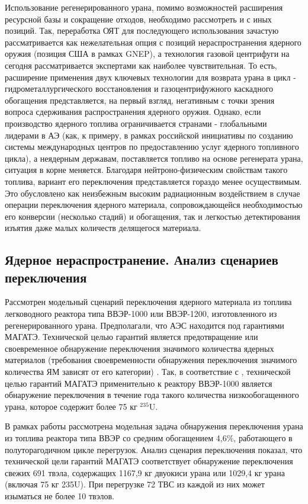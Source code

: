 Использование регенерированного урана, помимо возможностей расширения ресурсной базы и сокращение отходов, необходимо рассмотреть и с иных позиций. Так, переработка ОЯТ для последующего использования зачастую рассматривается как нежелательная опция с позиций нераспространения ядерного оружия (позиция США в рамках GNEP), а технология газовой центрифуги на сегодня рассматривается экспертами как наиболее чувствительная. То есть, расширение применения двух ключевых технологии для возврата урана в цикл - гидрометаллургического восстановления и газоцентрифужного каскадного обогащения представляется, на первый взгляд, негативным с точки зрения вопроса сдерживания распространения ядерного оружия. Однако, если производство ядерного топлива ограничивается странами - глобальными лидерами в АЭ (как, к примеру, в рамках российской инициативы по созданию системы международных центров по предоставлению услуг ядерного топливного цикла), а неядерным державам, поставляется топливо на основе регенерата урана, ситуация в корне меняется. Благодаря нейтроно-физическим свойствам такого топлива, вариант его переключения представляется гораздо менее осуществимым. Это обусловлено как неизбежным высоким радиационным воздействием в случае операции переключения ядерного материала, сопровождающейся необходимостью его конверсии (несколько стадий) и обогащения, так и легкостью детектирования изъятия даже малых количеств делящегося материала.


\subsection{Ядерное нераспространение. Анализ сценариев переключения}\label{sec:ch1/sec1.1}

Рассмотрен модельный сценарий переключения ядерного материала из топлива легководного реактора типа ВВЭР-1000 или ВВЭР-1200,  изготовленного из регенерированного урана. Предполагали, что АЭС находится под гарантиями МАГАТЭ. Технической целью гарантий является предотвращение или своевременное обнаружение переключения значимого количества ядерных материалов (требования своевременности обнаружения переключения значимого количества ЯМ зависят от  его категории) \cite{bumblis}. Так, в соответствие с \cite{bumblis}, технической целью гарантий МАГАТЭ применительно к реактору ВВЭР-1000 является обнаружение переключения в течение года такого количества низкообогащенного урана, которое содержит более 75 кг $^{235}$U.

В рамках работы рассмотрена модельная задача обнаружения переключения урана из топлива реактора типа ВВЭР со средним обогащением 4,6\%, работающего в полуторагодичном цикле перегрузок. Анализ сценария переключения показал, что технической цели гарантий МАГАТЭ соответствует обнаружение переключения свежих 691 твэла, содержащих 1167,9 кг двуокиси урана или 1029,4 кг урана (включая 75 кг 235U). При перегрузке 72 ТВС из каждой из них может изыматься не более 10 твэлов.

